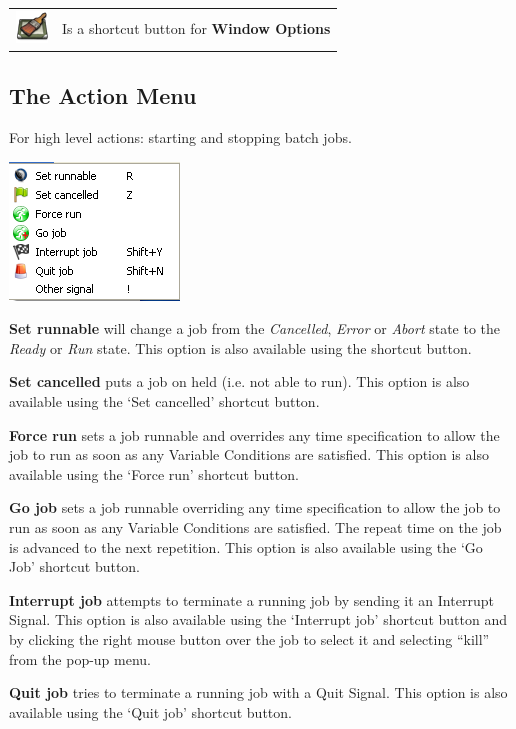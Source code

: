 \begin{tabular}{l p{12cm}}
\includegraphics{img/btqwwinopts.png} & Is a shortcut button for \textbf{Window Options}\\
\end{tabular}

\subsection{The Action Menu}
For high level actions: starting and stopping batch jobs.

\includegraphics{img/btqwactmenu.png} 

\textbf{Set runnable} will change a job from the \textit{Cancelled},
\textit{Error} or \textit{Abort} state to the \textit{Ready} or
\textit{Run} state. This option is also available using the shortcut
button.

\textbf{Set cancelled} puts a job on held (i.e. not able to run). This
option is also available using the `Set cancelled' shortcut button.

\textbf{Force run} sets a job runnable and overrides any time
specification to allow the job to run as soon as any Variable
Conditions are satisfied. This option is also available using the
`Force run' shortcut button.

\textbf{Go job} sets a job runnable overriding any time specification to
allow the job to run as soon as any Variable Conditions are satisfied.
The repeat time on the job is advanced to the next repetition. This
option is also available using the `Go Job' shortcut button.

\textbf{Interrupt job} attempts to terminate a running job by sending it
an Interrupt Signal. This option is also available using the
`Interrupt job' shortcut button and by clicking the right mouse button over the job to select it and
selecting ``kill'' from the pop-up menu.

\textbf{Quit job} tries to terminate a running job with a Quit Signal.
This option is also available using the `Quit job' shortcut button.

